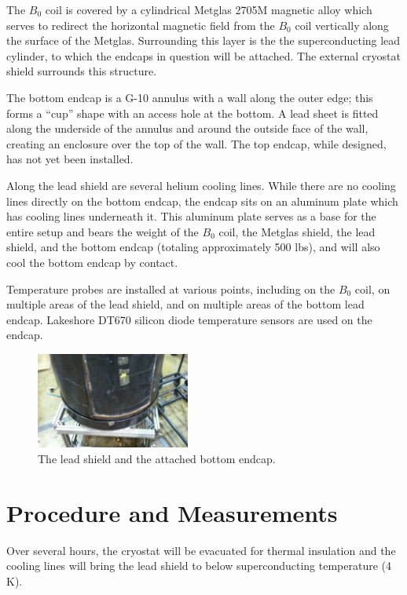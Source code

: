 \documentclass[twocolumn,aps,prb,citeautoscript]{revtex4-1}
\begin{document}
The $B_0$ coil is covered by a cylindrical Metglas 2705M magnetic
alloy which serves to redirect the horizontal magnetic field from the $B_0$
coil vertically along the surface of the Metglas. Surrounding this layer is the
the superconducting lead cylinder, to which the endcaps in
question will be attached. The external cryostat shield surrounds this
structure.

The bottom endcap is a G-10 annulus with a
wall along the outer edge; this forms a ``cup'' shape with an access hole
at the bottom. A lead sheet is fitted along the underside of
the annulus and around the outside face of the wall, creating an enclosure
over the top of the wall. The top endcap, while designed, has not yet been
installed.

Along the lead shield are several helium cooling lines. While there are no
cooling lines directly on the bottom endcap, the endcap sits on an aluminum
plate which has cooling lines underneath it. This aluminum plate serves
as a base for the entire setup and bears the weight of the $B_0$ coil, the
Metglas shield, the lead shield, and the bottom endcap
(totaling approximately 500 lbs), and will also cool
the bottom endcap by contact.

Temperature probes are installed at various points, including on the $B_0$
coil, on multiple areas of the lead shield, and on multiple areas of the
bottom lead endcap. Lakeshore DT670 silicon diode temperature sensors are
used on the endcap.

\begin{figure}
\includegraphics[width=0.45\textwidth]{endcap.png}
\caption{\label{fig:endcap}The lead shield and the attached bottom endcap.}
\end{figure}

\section{Procedure and Measurements}

Over several hours, the cryostat will be evacuated for thermal insulation and
the cooling lines will bring the lead shield to below superconducting
temperature (4 K).
\end{document}
